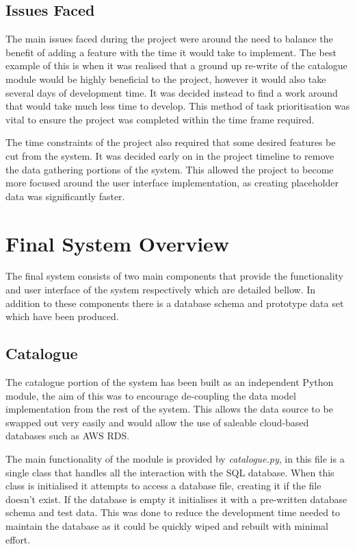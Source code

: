 \documentclass[12pt,titlepage]{article}
\begin{document}
  \subsection{Issues Faced}

  The main issues faced during the project were around the need to balance the
  benefit of adding a feature with the time it would take to implement. The best
  example of this is when it was realised that a ground up re-write of the
  catalogue module would be highly beneficial to the project, however it would
  also take several days of development time. It was decided instead to find a
  work around that would take much less time to develop. This method of task
  prioritisation was vital to ensure the project was completed within the
  time frame required.

  The time constraints of the project also required that some desired features
  be cut from the system. It was decided early on in the project timeline to
  remove the data gathering portions of the system. This allowed the project to
  become more focused around the user interface implementation, as creating
  placeholder data was significantly faster.

\section{Final System Overview}

  The final system consists of two main components that provide the
  functionality and user interface of the system respectively which are detailed
  bellow. In addition to these components there is a database schema and
  prototype data set which have been produced.

  \subsection{Catalogue}

  The catalogue portion of the system has been built as an independent Python
  module, the aim of this was to encourage de-coupling the data model
  implementation from the rest of the system. This allows the data source to be
  swapped out very easily and would allow the use of saleable cloud-based
  databases such as AWS RDS.

  The main functionality of the module is provided by \textit{catalogue.py}, in
  this file is a single class that handles all the interaction with the SQL
  database. When this class is initialised it attempts to access a database
  file, creating it if the file doesn't exist. If the database is empty it
  initialises it with a pre-written database schema and test data. This was done
  to reduce the development time needed to maintain the database as it could be
  quickly wiped and rebuilt with minimal effort.
\end{document}
